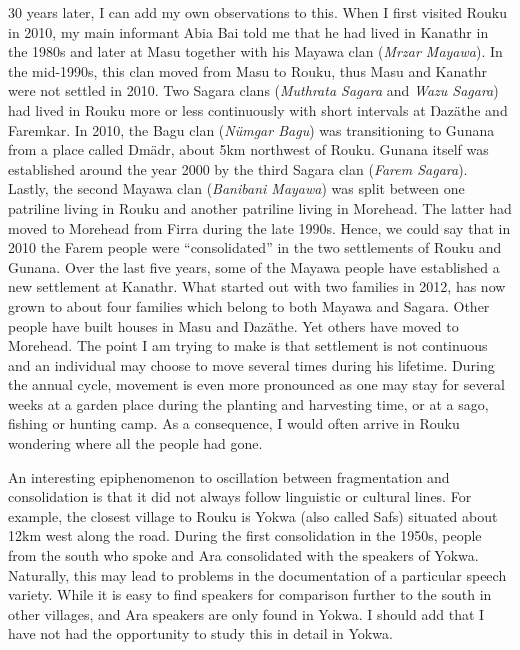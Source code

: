 30 years later, I can add my own observations to this. When I first visited Rouku in 2010, my main informant Abia Bai told me that he had lived in Kanathr in the 1980s and later at Masu together with his Mayawa clan (\emph{Mrzar Mayawa}). In the mid-1990s, this clan moved from Masu to Rouku, thus Masu and Kanathr were not settled in 2010. Two Sagara clans (\emph{Muthrata Sagara} and \emph{Wazu Sagara}) had lived in Rouku more or less continuously with short intervals at Ŋazäthe and Faremkar. In 2010, the Bagu clan (\emph{Nümgar Bagu}) was transitioning to Gunana from a place called Dmädr, about 5km northwest of Rouku. Gunana itself was established around the year 2000 by the third Sagara clan (\emph{Farem Sagara}). Lastly, the second Mayawa clan (\emph{Banibani Mayawa}) was split between one patriline living in Rouku and another patriline living in Morehead. The latter had moved to Morehead from Firra during the late 1990s. Hence, we could say that in 2010 the Farem people were ``consolidated'' in the two settlements of Rouku and Gunana. Over the last five years, some of the Mayawa people have established a new settlement at Kanathr. What started out with two families in 2012, has now grown to about four families which belong to both Mayawa and Sagara. Other people have built houses in Masu and Ŋazäthe. Yet others have moved to Morehead. The point I am trying to make is that settlement is not continuous and an individual may choose to move several times during his lifetime. During the annual cycle, movement is even more pronounced as one may stay for several weeks at a garden place during the planting and harvesting time, or at a sago, fishing or hunting camp. As a consequence, I would often arrive in Rouku wondering where all the people had gone.

An interesting epiphenomenon to oscillation between fragmentation and consolidation is that it did not always follow linguistic or cultural lines. For example, the closest village to Rouku is Yokwa (also called Safs) situated about 12km west along the road. During the first consolidation in the 1950s, people from the south who spoke  and Ara consolidated with the  speakers of Yokwa. Naturally, this may lead to problems in the documentation of a particular speech variety. While it is easy to find  speakers for comparison further to the south in other villages,  and Ara speakers are only found in Yokwa. I should add that I have not had the opportunity to study this in detail in Yokwa.

